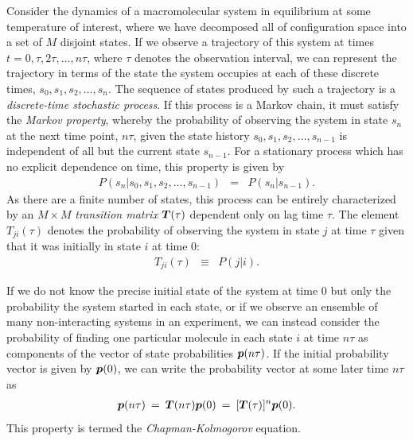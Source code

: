 Consider the dynamics of a macromolecular system in equilibrium at some temperature of interest, where we have decomposed all of configuration space into a set of $M$ disjoint states.
If we observe a trajectory of this system at times $t = 0, \tau, 2 \tau, \ldots, n \tau$, where $\tau$ denotes the observation interval, we can represent the trajectory in terms of the state the system occupies at each of these discrete times, $s_0, s_1, s_2, \ldots, s_n$.
The sequence of states produced by such a trajectory is a \emph{discrete-time stochastic process}.
If this process is a Markov chain, it must satisfy the \emph{Markov property}, whereby the probability of observing the system in state $s_n$ at the next time point, $n\tau$, given the state history $s_0, s_1,s_2,\ldots,s_{n-1}$ is independent of all but the current state $s_{n-1}$.
For a stationary process which has no explicit dependence on time, this property is given by
\begin{eqnarray}
P(s_n | s_0, s_1, s_2, \dots, s_{n-1}) &=& P(s_n | s_{n-1}) . \label{long-times:equation:markov-property}
\end{eqnarray}
As there are a finite number of states, this process can be entirely characterized by an $M \times M$ \emph{transition matrix} ${\mbox{\boldmath{$T$}}}(\tau)$ dependent only on lag time $\tau$.
The element $T_{ji}(\tau)$ denotes the probability of observing the system in state $j$ at time $\tau$ given that it was initially in state $i$ at time $0$:
\begin{eqnarray}
T_{ji}(\tau) &\equiv& P(j | i) .
\end{eqnarray}

If we do not know the precise initial state of the system at time $0$ but only the probability the system started in each state, or if we observe an ensemble of many non-interacting systems in an experiment, we can instead consider the probability of finding one particular molecule in each state $i$ at time $n\tau$ as components of the vector of state probabilities ${\mbox{\boldmath{$p$}}}(n\tau)$.
If the initial probability vector is given by ${\mbox{\boldmath{$p$}}}(0)$, we can write the probability vector at some later time $n\tau$ as
\begin{eqnarray}
{\mbox{\boldmath{$p$}}}(n \tau) \: = \: {\mbox{\boldmath{$T$}}}(n \tau) {\mbox{\boldmath{$p$}}}(0) \: = \: [{\mbox{\boldmath{$T$}}}(\tau)]^n {\mbox{\boldmath{$p$}}}(0) . \label{long-times:equation:chapman-kolmogorov}
\end{eqnarray}
This property is termed the \emph{Chapman-Kolmogorov} equation.

